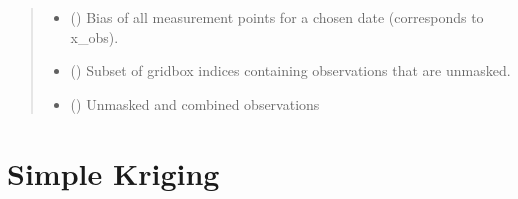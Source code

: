 \documentclass[letterpaper,10pt,english]{sphinxmanual}
\begin{document}
\begin{fulllineitems}
\begin{quote}
\begin{description}
\begin{itemize}
\begin{itemize}
\item {}
 = the mean is removed

\item {}
 = the median is removed

\item {}
 = the spatial meam os removed

\end{itemize}

\sphinxAtStartPar
Note that the mean will need to be reapplied to the Kriging result.


\item {}
\sphinxAtStartPar
{} () \textendash{} Bias of all measurement points for a chosen date (corresponds to x\_obs).

\end{itemize}

\sphinxAtStartPar
{}

\sphinxAtStartPar
\begin{itemize}
\item {}
\sphinxAtStartPar
{} () \textendash{} Subset of grid\sphinxhyphen{}box indices containing observations that are unmasked.

\item {}
\sphinxAtStartPar
{} () \textendash{} Unmasked and combined observations

\end{itemize}


\end{description}\end{quote}

\end{fulllineitems}



\section{Simple Kriging}
\label{\detokenize{kriging:simple-kriging}}
\end{document}
